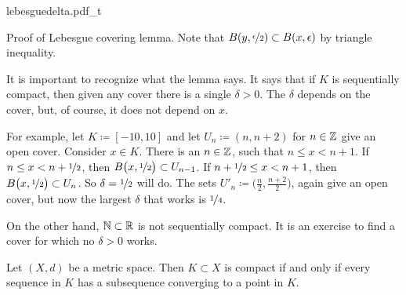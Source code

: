 \begin{myfigureht}
{lebesguedelta.pdf_t}
\caption{Proof of Lebesgue covering lemma.
Note that $B(y,\nicefrac{\epsilon}{2}) \subset
B(x,\epsilon)$ by triangle inequality.\label{fig:lebesguedelta}}
\end{myfigureht}

It is important to recognize what the lemma says.  It says that
if $K$ is sequentially compact, then given any
cover there is a single $\delta > 0$.  The $\delta$ depends on the cover,
but, of course, it does not depend on $x$.

For example, let $K \coloneqq [-10,10]$ and let
$U_n \coloneqq (n,n+2)$ for $n \in {\mathbb{Z}}$
give an open cover.
Consider $x \in K$. There is an $n \in {\mathbb{Z}}$, 
such that $n \leq x < n+1$.
If $n \leq x < n+\nicefrac{1}{2}$, then
$B\bigl(x,\nicefrac{1}{2}\bigr) \subset U_{n-1}$.
If $n+ \nicefrac{1}{2} \leq x < n+1$, then
$B\bigl(x,\nicefrac{1}{2}\bigr) \subset U_{n}$.  So $\delta =
\nicefrac{1}{2}$ will do.  The sets 
$U'_n \coloneqq \bigl(\frac{n}{2},\frac{n+2}{2} \bigr)$,
again give an open cover,
but now the largest $\delta$ that works is $\nicefrac{1}{4}$.

On the other hand, ${\mathbb{N}} \subset {\mathbb{R}}$ is not sequentially compact.
It is an exercise to find a cover for which no $\delta > 0$ works.


\begin{thm} \label{thm:mscompactisseqcpt}
Let $(X,d)$ be a metric space.  Then $K \subset X$ is compact if
and only if every sequence in $K$ has a subsequence converging to
a point in $K$.
\end{thm}

